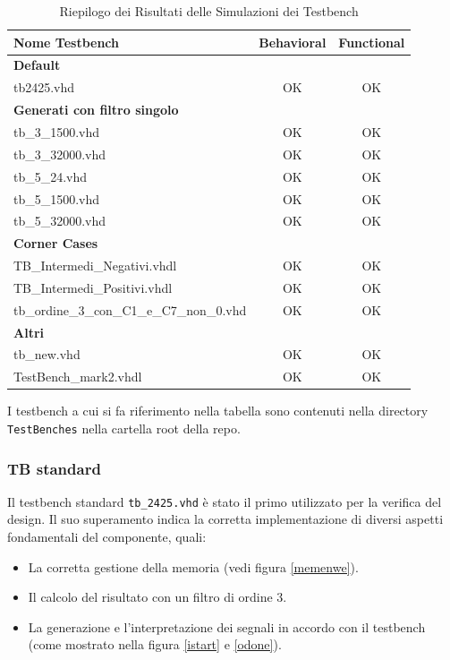 \documentclass{article}
\begin{document}
\begin{table}[H]
    \centering
    \caption{Riepilogo dei Risultati delle Simulazioni dei Testbench}
    \label{tab:testbench_results}
    \begin{tabular}{|l|c|c|}
        \hline
        \textbf{Nome Testbench} & \textbf{Behavioral} & \textbf{Functional} \\
        \hline
        \multicolumn{3}{|l|}{\textbf{Default}} \\
        \hline
        tb2425.vhd & OK & OK \\
        \hline
        \multicolumn{3}{|l|}{\textbf{Generati con filtro singolo}} \\
        \hline
        tb\_3\_1500.vhd & OK & OK \\
        tb\_3\_32000.vhd & OK & OK \\
        tb\_5\_24.vhd & OK & OK \\
        tb\_5\_1500.vhd & OK & OK \\
        tb\_5\_32000.vhd & OK & OK \\
        \hline
        \multicolumn{3}{|l|}{\textbf{Corner Cases}} \\
        \hline
        TB\_Intermedi\_Negativi.vhdl & OK & OK \\
        TB\_Intermedi\_Positivi.vhdl & OK & OK \\
        tb\_ordine\_3\_con\_C1\_e\_C7\_non\_0.vhd & OK & OK \\
        \hline
        \multicolumn{3}{|l|}{\textbf{Altri}} \\
        \hline
        tb\_new.vhd & OK & OK \\
        TestBench\_mark2.vhdl & OK & OK \\
        \hline
    \end{tabular}
\end{table}

I testbench a cui si fa riferimento nella tabella sono contenuti nella directory \texttt{TestBenches} nella cartella root della repo.

\subsubsection{TB standard}

Il testbench standard \texttt{tb\_2425.vhd} è stato il primo utilizzato per la verifica del design. Il suo superamento indica la corretta implementazione di diversi aspetti fondamentali del componente, quali:
\begin{itemize}
    \item La corretta gestione della memoria (vedi figura \ref{memenwe}).
    \item Il calcolo del risultato con un filtro di ordine 3.
    \item La generazione e l'interpretazione dei segnali in accordo con il testbench (come mostrato nella figura \ref{istart} e \ref{odone}).
\end{itemize}
\end{document}
